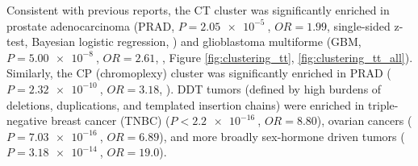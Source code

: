 \documentclass[phd,tocprelim]{cornell}
\renewcommand{\caption}[1]{\singlespacing\hangcaption{#1}\normalspacing}
\begin{document}







Consistent with previous reports, the CT cluster was significantly enriched in prostate adenocarcinoma  (PRAD, $P = \SI{2.05e-5}{}$, $OR = 1.99$, single-sided z-test, Bayesian logistic regression, \cite{Kovtun2015-kq}) and glioblastoma multiforme (GBM, $P = \SI{5.00e-8}{}$, $OR = 2.61$, \cite{Furgason2015-rv}, Figure \ref{fig:clustering_tt}, \ref{fig:clustering_tt_all}). Similarly, the CP (chromoplexy) cluster was significantly enriched in PRAD ($P = \SI{2.32e-10}{}$, $OR = 3.18$, \cite{baca2013}). DDT tumors (defined by high burdens of deletions, duplications, and templated insertion chains) were enriched in triple-negative breast cancer (TNBC) ($P < \SI{2.2e-16}{}$, $OR = 8.80$),  ovarian cancers ($P = \SI{7.03e-16}{}$, $OR = 6.89$), and more broadly sex-hormone driven tumors ($P = \SI{3.18e-14}{}$, $OR = 19.0$).
\end{document}
